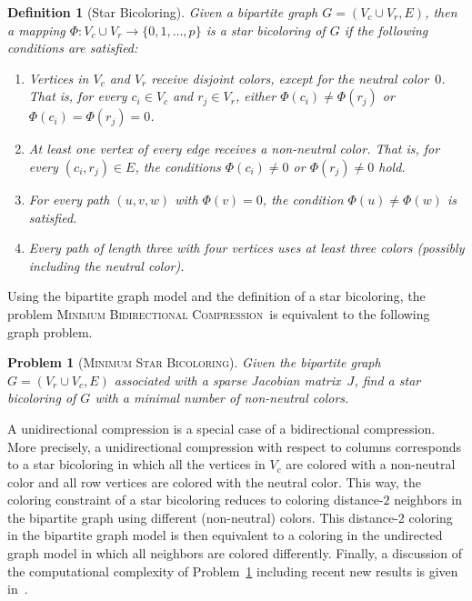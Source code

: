 \documentclass[12pt, twoside,a4paper,toc=bibliography]{scrbook}
\newtheorem{problem}{Problem}
\newtheorem{definition}{Definition}
\newcommand{\MinStaBic}{\textsc{Minimum Star Bicoloring}}
\newcommand{\MinBidCom}{\textsc{Minimum Bidirectional Compression}}
\begin{document}
\begin{definition}[Star Bicoloring]\label{d.coloring}
Given a bipartite graph $G=(V_c\cup V_r, E)$, then a mapping $\Phi:V_c \cup V_r \to
\{0,1,\dots ,p\}$ is a star bicoloring of $G$ if the following conditions are satisfied:
\begin{enumerate}
\item Vertices in $V_c$ and $V_r$ receive disjoint colors, except for the neutral color~$0$. That
is, for every $c_i \in V_c$ and $r_j \in V_r$, either $\Phi(c_i) \neq \Phi(r_j)$ or
$\Phi(c_i)=\Phi(r_j)=0$.

\item At least one vertex of every edge receives a non-neutral color. That is, for every
$(c_i,r_j)\in E$, the conditions $\Phi(c_i)\neq 0$ or $\Phi(r_j)\neq 0$ hold.

\item For every path $(u,v,w)$ with $\Phi(v) = 0$, the condition $\Phi(u)\neq \Phi(w)$ is
satisfied.
\item Every path of length three with four vertices uses at least three colors
(possibly including the neutral color).
\end{enumerate}
\end{definition}

Using the bipartite graph model and the definition of a star bicoloring, the problem
\MinBidCom\ is equivalent to the following graph problem.

\begin{problem}[\MinStaBic]
\label{p.coloring} Given the bipartite graph $G=(V_r\cup V_c, E)$ associated with a sparse Jacobian
matrix~$J$, find a star bicoloring of $G$ with a minimal number of non-neutral colors.
\end{problem}

A unidirectional compression is a special case of a bidirectional compression. More precisely, a
unidirectional compression with respect to columns corresponds to a star bicoloring in which all
the vertices in $V_c$ are colored with a non-neutral color and all row vertices are colored with
the neutral color. This way, the coloring constraint of a star bicoloring reduces to coloring
distance-$2$ neighbors in the bipartite graph using different (non-neutral) colors. This distance-2
coloring in the bipartite graph model is then equivalent to a coloring in the undirected graph
model in which all neighbors are colored differently. Finally, a discussion of the computational
complexity of Problem~\ref{p.coloring} including recent new results is given in~\cite{jj:cjr}.
\end{document}
